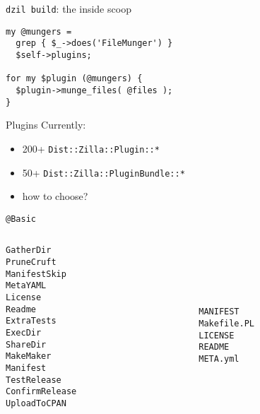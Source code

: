 \documentclass[serif,14pt,color=usenames,dvipsnames]{beamer}
\begin{document}
\begin{frame}[fragile]{\texttt{dzil build}: the inside scoop}
\begin{verbatim}
my @mungers =
  grep { $_->does('FileMunger') }
  $self->plugins;

for my $plugin (@mungers) {
  $plugin->munge_files( @files );
}
\end{verbatim}
\end{frame}

{ %
\begin{frame}
\end{frame}}


\begin{frame}{Plugins}
Currently:
\begin{itemize}
	\item 200+ \texttt{Dist::Zilla::Plugin::*}
	\item 50+ \texttt{Dist::Zilla::PluginBundle::*}
	\item how to choose?
\end{itemize}
\end{frame}


\begin{frame}[fragile]{\texttt{@Basic}}
\begin{columns}[t]
\begin{column}{.3\textwidth}
\begin{overprint}
\begin{verbatim}
GatherDir
PruneCruft
ManifestSkip
MetaYAML
License
Readme
ExtraTests
ExecDir
ShareDir
MakeMaker
Manifest
TestRelease
ConfirmRelease
UploadToCPAN
\end{verbatim}
\end{overprint}
\end{column}
\begin{column}{.4\textwidth}
\begin{overprint}
~\\
~\\
\begin{block}{~}
\begin{verbatim}
MANIFEST
Makefile.PL
LICENSE
README
META.yml
\end{verbatim}
\end{block}
\end{overprint}
\end{column}
\end{columns}
\end{frame}
\end{document}
